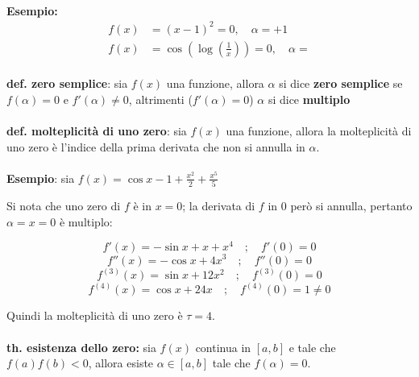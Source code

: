 \documentclass[a4paper, 11pt]{article}
\begin{document}
    
        \paragraph{}
        \textbf{Esempio:}
        \begin{align*}
            f(x) &= (x - 1)^2 = 0, \quad \text{$\alpha = +1$} \\
            f(x) &= \cos\left(\log\left(\frac{1}{x}\right)\right) = 0, \quad \text{$\alpha =  $}
        \end{align*}
           
        

        \paragraph{}
        \textbf{def. zero semplice}: sia $f(x)$ una funzione, allora $\alpha$ si dice \textbf{zero semplice} se $f(\alpha) = 0$ e $f'(\alpha) \neq 0 $, altrimenti ($f'(\alpha) = 0$) $\alpha$ si dice \textbf{multiplo}

        \paragraph{}
        \textbf{def. molteplicità di uno zero}: sia $f(x)$ una funzione, allora la molteplicità di uno zero è l'indice della prima derivata che non si annulla in $\alpha$.

        \paragraph{}
        \textbf{Esempio}: sia $f(x) = \cos{x}-1+\frac{x^2}{2}+\frac{x^5}{5}$

        Si nota che uno zero di $f$ è in $x = 0$; la derivata di $f$ in 0 però si annulla, pertanto $\alpha = x = 0$ è multiplo:

        \[ f'(x) = -\sin x + x + x^4 \quad ; \quad f'(0) = 0\]
        \[ f''(x) = -\cos x + 4x^3 \quad ; \quad f''(0) = 0\]
        \[ f^{(3)}(x) = \sin x + 12x^2 \quad ; \quad f^{(3)}(0) = 0 \]
        \[ f^{(4)}(x) = \cos x + 24x \quad ; \quad f^{(4)}(0) = 1 \neq 0 \]
        

        Quindi la molteplicità di uno zero è \( \tau = 4 \).

        \paragraph{}
        \textbf{th. esistenza dello zero:} sia \( f(x) \) continua in \([a,b]\) e tale che \( f(a)f(b) < 0 \), allora esiste \( \alpha \in [a,b] \) tale che \( f(\alpha) = 0 \).
\end{document}
